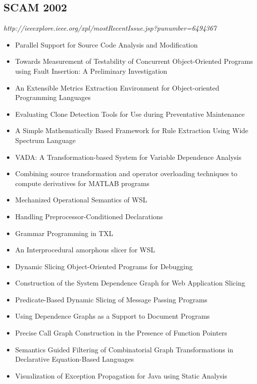 \subsection{SCAM 2002}

{\small \em http://ieeexplore.ieee.org/xpl/mostRecentIssue.jsp?punumber=6494367}

{\small
\begin{itemize}[itemsep=-1ex]
  \item Parallel Support for Source Code Analysis and Modification {\color{blue} \checkmark}{\color{red} \texttimes}
  \item Towards Measurement of Testability of Concurrent Object-Oriented Programs using Fault Insertion: A Preliminary Investigation
  \item An Extensible Metrics Extraction Environment for Object-oriented Programming Languages {\color{blue} \checkmark}{\color{red} \texttimes}
  \item Evaluating Clone Detection Tools for Use during Preventative Maintenance
  \item A Simple Mathematically Based Framework for Rule Extraction Using Wide Spectrum Language
  \item VADA: A Transformation-based System for Variable Dependence Analysis {\color{blue} \checkmark}{\color{red} \texttimes}
  \item Combining source transformation and operator overloading techniques to compute derivatives for MATLAB programs {\color{blue} \checkmark}{\color{red} \texttimes}
  \item Mechanized Operational Semantics of WSL
  \item Handling Preprocessor-Conditioned Declarations
  \item Grammar Programming in TXL
  \item An Interprocedural amorphous slicer for WSL
  \item Dynamic Slicing Object-Oriented Programs for Debugging
  \item Construction of the System Dependence Graph for Web Application Slicing
  \item Predicate-Based Dynamic Slicing of Message Passing Programs
  \item Using Dependence Graphs as a Support to Document Programs
  \item Precise Call Graph Construction in the Presence of Function Pointers
  \item Semantics Guided Filtering of Combinatorial Graph Transformations in Declarative Equation-Based Languages {\color{blue} \checkmark}{\color{red} \texttimes}
  \item Visualization of Exception Propagation for Java using Static Analysis {\color{blue} \checkmark}{\color{red} \texttimes}
\end{itemize}
}

